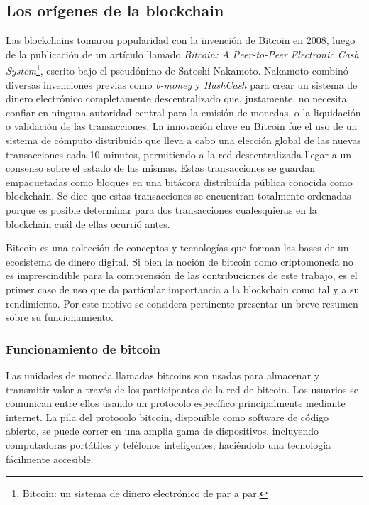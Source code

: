 \subsection{Los orígenes de la blockchain}
Las blockchains tomaron popularidad con la invención de Bitcoin en 2008, luego de la publicación
de un artículo llamado \textit{Bitcoin: A Peer-to-Peer
Electronic Cash System}\footnote{Bitcoin: un sistema de dinero electrónico de par a par.}, escrito
bajo el pseudónimo de Satoshi Nakamoto.
Nakamoto combinó diversas invenciones previas como
\textit{b-money} y \textit{HashCash} para crear un sistema de dinero electrónico completamente
descentralizado que, justamente, no necesita confiar en ninguna autoridad central para la emisión de monedas,
o la liquidación o validación de las transacciones. 
La innovación clave en Bitcoin fue el uso de un sistema de cómputo distribuído que lleva
a cabo una elección global de las nuevas transacciones cada 10 minutos, permitiendo
a la red descentralizada llegar a un consenso sobre el estado de las mismas. Estas transacciones
se guardan empaquetadas como bloques en una bitácora distribuída pública conocida como blockchain.
Se dice que estas transacciones se encuentran totalmente ordenadas porque es posible determinar para
dos transacciones cualesquieras en la blockchain cuál de ellas ocurrió antes.


Bitcoin es una colección de conceptos y tecnologías que forman las bases de un ecosistema de dinero
digital. Si bien la noción de bitcoin como criptomoneda no es imprescindible para la comprensión de las
contribuciones de este trabajo, es el primer caso de uso que da particular importancia a la blockchain
como tal y a su rendimiento. Por este motivo se considera pertinente presentar un breve resumen sobre
su funcionamiento.

\subsubsection{Funcionamiento de bitcoin}

Las unidades de moneda llamadas bitcoins son usadas para almacenar y transmitir valor a través
de los participantes de la red de bitcoin. Los usuarios se comunican entre ellos usando un protocolo 
específico principalmente mediante internet. La pila del
protocolo bitcoin, disponible como software de código abierto, se puede correr en una amplia gama de
dispositivos, incluyendo computadoras portátiles y teléfonos inteligentes, haciéndolo una tecnología
fácilmente accesible.

